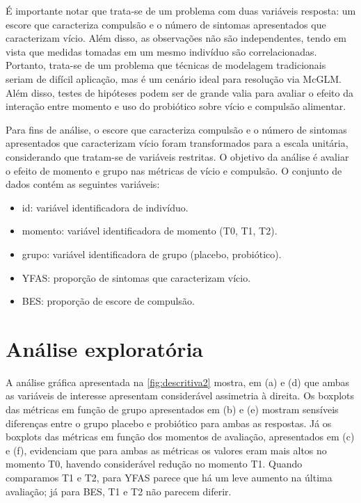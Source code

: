 É importante notar que trata-se de um problema com duas variáveis resposta: um escore que caracteriza compulsão e o número de sintomas apresentados que caracterizam vício. Além disso, as observações não são independentes, tendo em vista que medidas tomadas em um mesmo indivíduo são correlacionadas. Portanto, trata-se de um problema que técnicas de modelagem tradicionais seriam de difícil aplicação, mas é um cenário ideal para resolução via McGLM. Além disso, testes de hipóteses podem ser de grande valia para avaliar o efeito da interação entre momento e uso do probiótico sobre vício e compulsão alimentar.

Para fins de análise, o escore que caracteriza compulsão e o número de sintomas apresentados que caracterizam vício foram transformados para a escala unitária, considerando que tratam-se de variáveis restritas. O objetivo da análise é avaliar o efeito de momento e grupo nas métricas de vício e compulsão. O conjunto de dados contém as seguintes variáveis:

\begin{itemize}
  \item id: variável identificadora de indivíduo.
  \item momento: variável identificadora de momento (T0, T1, T2).
  \item grupo: variável identificadora de grupo (placebo, probiótico).
  \item YFAS: proporção de sintomas que caracterizam vício.
  \item BES: proporção de escore de compulsão.
\end{itemize}


\section{Análise exploratória}

A análise gráfica apresentada na \autoref{fig:descritiva2} mostra, em (a) e (d) que ambas as variáveis de interesse apresentam considerável assimetria à direita. Os boxplots das métricas em função de grupo apresentados em (b) e (e) mostram sensíveis diferenças entre o grupo placebo e probiótico para ambas as respostas. Já os boxplots das métricas em função dos momentos de avaliação, apresentados em (c) e (f), evidenciam que para ambas as métricas os valores eram mais altos no momento T0, havendo considerável redução no momento T1. Quando comparamos T1 e T2, para YFAS parece que há um leve aumento na última avaliação; já para BES, T1 e T2 não parecem diferir.

